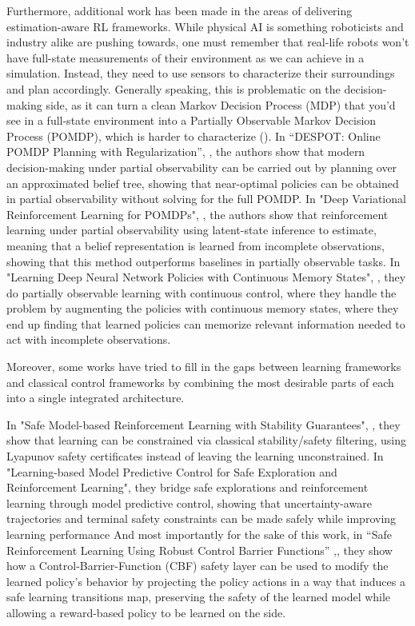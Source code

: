 Furthermore, additional work has been made in the areas of delivering estimation-aware RL frameworks. While physical AI is something roboticists and industry alike are pushing towards, one must remember that real-life robots won't have full-state measurements of their environment as we can achieve in a simulation. Instead, they need to use sensors to characterize their surroundings and plan accordingly. Generally speaking, this is problematic on the decision-making side, as it can turn a clean Markov Decision Process (MDP) that you'd see in a full-state environment into a Partially Observable Markov Decision Process (POMDP), which is harder to characterize (\cite{kaelbling1998pomdp}). In “DESPOT: Online POMDP Planning with Regularization”, \cite{ye2017despot}, the authors show that modern decision-making under partial observability can be carried out by planning over an approximated belief tree, showing that near-optimal policies can be obtained in partial observability without solving for the full POMDP. In "Deep Variational Reinforcement Learning for POMDPs", \cite{igl2018dvrl}, the authors show that reinforcement learning under partial observability using latent-state inference to estimate, meaning that a belief representation is learned from incomplete observations, showing that this method outperforms baselines in partially observable tasks. In "Learning Deep Neural Network Policies with Continuous Memory States", \cite{zhang2015continuousmemory}, they do partially observable learning with continuous control, where they handle the problem by augmenting the policies with continuous memory states, where they end up finding that learned policies can memorize relevant information needed to act with incomplete observations.

Moreover, some works have tried to fill in the gaps between learning frameworks and classical control frameworks by combining the most desirable parts of each into a single integrated architecture.

In "Safe Model-based Reinforcement Learning with Stability Guarantees", \cite{berkenkamp2017safembrl} , they show that learning can be constrained via classical stability/safety filtering, using Lyapunov safety certificates instead of leaving the learning unconstrained. In "Learning-based Model Predictive Control for Safe Exploration and Reinforcement Learning", \cite{koller2019safeexplorationrl} they bridge safe explorations and reinforcement learning through model predictive control, showing that uncertainty-aware trajectories and terminal safety constraints can be made safely while improving learning performance And most importantly for the sake of this work, in “Safe Reinforcement Learning Using Robust Control Barrier Functions” ,\cite{emam2021saferlrcbf}, they show how a Control-Barrier-Function (CBF) safety layer can be used to modify the learned policy's behavior by projecting the policy actions in a way that induces a safe learning transitions map, preserving the safety of the learned model while allowing a reward-based policy to be learned on the side.

